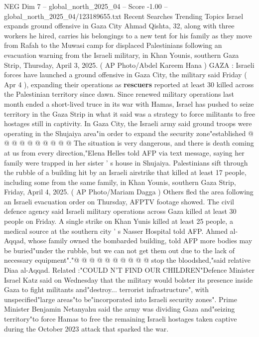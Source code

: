 \begin{textsample}{NEG Dim 7 – global\_north\_2025\_04 – Score -1.00 – global\_north\_2025\_04/123189655.txt}  \label{ex:f7_neg_096}
Recent Searches Trending Topics Israel expands ground offensive in Gaza City Ahmad Qishta, 32, along with three workers he hired, carries his belongings to a new tent for his family as they move from Rafah to the Muwasi camp for displaced Palestinians following an evacuation warning from the Israeli military, in Khan Younis, southern Gaza Strip, Thursday, April 3, 2025. ( AP Photo/Abdel Kareem Hana ) GAZA : Israeli forces have launched a ground offensive in Gaza City, the military said Friday ( Apr 4 ), expanding their operations as \textbf{rescuers} reported at least 30 killed across the Palestinian territory since dawn.
Since renewed military operations last month ended a short-lived truce in its war with Hamas, Israel has pushed to seize territory in the Gaza Strip in what it said was a strategy to force militants to free hostages still in captivity.
In Gaza City, the Israeli army said ground troops were operating in the Shujaiya area"in order to expand the security zone"established @ @ @ @ @ @ @ @ @ @ The situation is very dangerous, and there is death coming at us from every direction,"Elena Helles told AFP via text message, saying her family were trapped in her sister ' s house in Shujaiya.
Palestinians sift through the rubble of a building hit by an Israeli airstrike that killed at least 17 people, including some from the same family, in Khan Younis, southern Gaza Strip, Friday, April 4, 2025. ( AP Photo/Mariam Dagga ) Others fled the area following an Israeli evacuation order on Thursday, AFPTV footage showed.
The civil defence agency said Israeli military operations across Gaza killed at least 30 people on Friday.
A single strike on Khan Yunis killed at least 25 people, a medical source at the southern city ' s Nasser Hospital told AFP.
Ahmed al-Aqqad, whose family owned the bombarded building, told AFP more bodies may be buried"under the rubble, but we can not get them out due to the lack of necessary equipment"."@ @ @ @ @ @ @ @ @ @ stop the bloodshed,"said relative Diaa al-Aqqad.
Related :"COULD N'T FIND OUR CHILDREN"Defence Minister Israel Katz said on Wednesday that the military would bolster its presence inside Gaza to fight militants and"destroy... terrorist infrastructure", with unspecified"large areas"to be"incorporated into Israeli security zones".
Prime Minister Benjamin Netanyahu said the army was dividing Gaza and"seizing territory"to force Hamas to free the remaining Israeli hostages taken captive during the October 2023 attack that sparked the war.

\end{textsample}
